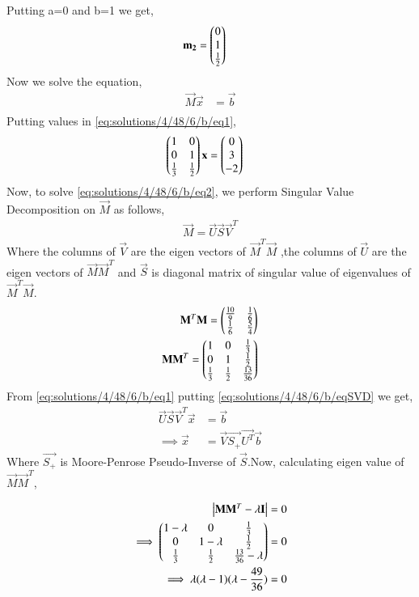 {Putting a=0 and b=1 we get,}
\begin{align}
\mathbf{m_2} &= \begin{pmatrix}0\\1\\ \frac{1}{2}\end{pmatrix}
\end{align}
Now we solve the equation,
\begin{align}
\vec{M}\vec{x} &= \vec{b}\label{eq:solutions/4/48/6/b/eq1}\\
\end{align}
{Putting values in \eqref{eq:solutions/4/48/6/b/eq1},}
\begin{align}
\begin{pmatrix}1&0\\0&1\\ \frac{1}{3}& \frac{1}{2}\end{pmatrix}\mathbf{x} &= \begin{pmatrix}0\\3\\-2\end{pmatrix}\label{eq:solutions/4/48/6/b/eq2}
\end{align}
Now, to solve \eqref{eq:solutions/4/48/6/b/eq2}, we perform Singular Value Decomposition on $\vec{M}$ as follows,
\begin{align}
\vec{M}=\vec{U}\vec{S}\vec{V}^T\label{eq:solutions/4/48/6/b/eqSVD}
\end{align}
Where the columns of $\vec{V}$ are the eigen vectors of $\vec{M}^T\vec{M}$ ,the columns of $\vec{U}$ are the eigen vectors of $\vec{M}\vec{M}^T$ and $\vec{S}$ is diagonal matrix of singular value of eigenvalues of $\vec{M}^T\vec{M}$.
\begin{align}
\mathbf{M}^T\mathbf{M}=\begin{pmatrix}\frac{10}{9}& \frac{1}{6}\\ \frac{1}{6}&\frac{5}{4}\end{pmatrix}\label{eq:solutions/4/48/6/b/eqMTM}\\
\mathbf{M}\mathbf{M}^T=\begin{pmatrix}1&0& \frac{1}{3}\\0&1& \frac{1}{2}\\ \frac{1}{3}& \frac{1}{2}& \frac{13}{36}\end{pmatrix}
\end{align}
From \eqref{eq:solutions/4/48/6/b/eq1} putting \eqref{eq:solutions/4/48/6/b/eqSVD} we get,
\begin{align}
\vec{U}\vec{S}\vec{V}^T\vec{x} & = \vec{b}\\
\implies\vec{x} &= \vec{V}\vec{S_+}\vec{U^T}\vec{b}\label{eq:solutions/4/48/6/b/eqX}
\end{align}
Where $\vec{S_+}$ is Moore-Penrose Pseudo-Inverse of $\vec{S}$.Now, calculating eigen value of $\vec{M}\vec{M}^T$,


\begin{align}
\begin{vmatrix}\mathbf{M}\mathbf{M}^T - \lambda\mathbf{I}\end{vmatrix} &= 0\\
\implies\begin{pmatrix}1-\lambda&0& \frac{1}{3} \\0&1-\lambda& \frac{1}{2}\\   \frac{1}{3}& \frac{1}{2}&\frac{13}{36}-\lambda\end{pmatrix} &=0\\
\implies\lambda (\lambda - 1)(\lambda - \frac{49}{36}) &=0
\end{align}


